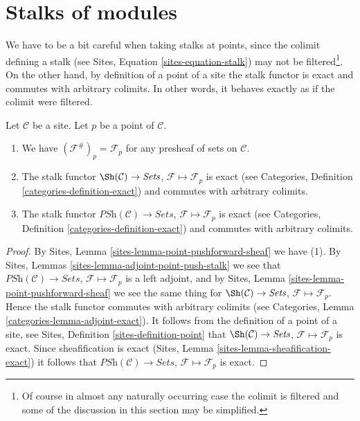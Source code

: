 \section{Stalks of modules}
\label{section-stalks}

\noindent
We have to be a bit careful when taking stalks at points,
since the colimit defining a stalk (see
Sites, Equation \ref{sites-equation-stalk})
may not be filtered\footnote{Of course in almost any naturally occurring
case the colimit is filtered and some of the discussion in this section
may be simplified.}. On the other hand, by definition of a point of a site
the stalk functor is exact and commutes with arbitrary colimits.
In other words, it behaves exactly as if the colimit were filtered.

\begin{lemma}
\label{lemma-stalk-exact}
Let $\mathcal{C}$ be a site.
Let $p$ be a point of $\mathcal{C}$.
\begin{enumerate}
\item We have $(\mathcal{F}^\#)_p = \mathcal{F}_p$
for any presheaf of sets on $\mathcal{C}$.
\item The stalk functor
$\Sh(\mathcal{C}) \to \textit{Sets}$,
$\mathcal{F} \mapsto \mathcal{F}_p$ is exact (see
Categories, Definition \ref{categories-definition-exact})
and commutes with arbitrary colimits.
\item The stalk functor
$\textit{PSh}(\mathcal{C}) \to \textit{Sets}$,
$\mathcal{F} \mapsto \mathcal{F}_p$ is exact (see
Categories, Definition \ref{categories-definition-exact})
and commutes with arbitrary colimits.
\end{enumerate}
\end{lemma}

\begin{proof}
By
Sites, Lemma \ref{sites-lemma-point-pushforward-sheaf}
we have (1).
By
Sites, Lemmas \ref{sites-lemma-adjoint-point-push-stalk}
we see that
$\textit{PSh}(\mathcal{C}) \to \textit{Sets}$,
$\mathcal{F} \mapsto \mathcal{F}_p$ is a left adjoint,
and by
Sites, Lemma \ref{sites-lemma-point-pushforward-sheaf}
we see the same thing for
$\Sh(\mathcal{C}) \to \textit{Sets}$,
$\mathcal{F} \mapsto \mathcal{F}_p$.
Hence the stalk functor commutes with arbitrary colimits (see
Categories, Lemma \ref{categories-lemma-adjoint-exact}).
It follows from the definition of a point of a site, see
Sites, Definition \ref{sites-definition-point}
that $\Sh(\mathcal{C}) \to \textit{Sets}$,
$\mathcal{F} \mapsto \mathcal{F}_p$
is exact. Since sheafification is exact
(Sites, Lemma \ref{sites-lemma-sheafification-exact})
it follows that $\textit{PSh}(\mathcal{C}) \to \textit{Sets}$,
$\mathcal{F} \mapsto \mathcal{F}_p$
is exact.
\end{proof}

